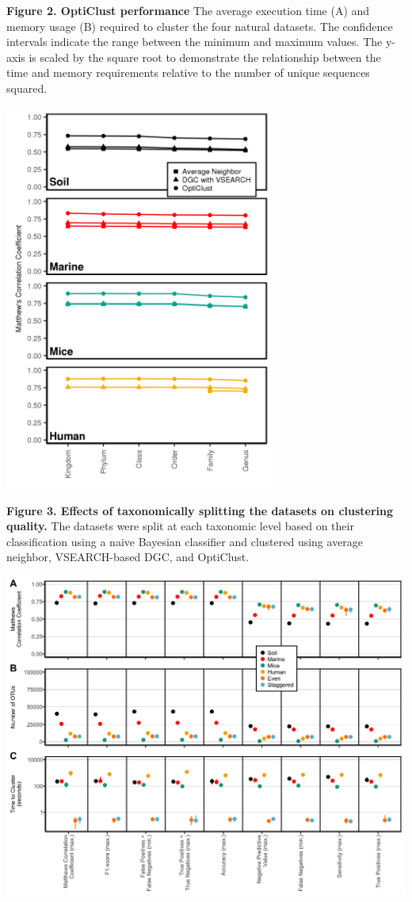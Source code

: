 \documentclass[11pt,]{article}
\begin{document}
\textbf{Figure 2. OptiClust performance} The average execution time (A)
and memory usage (B) required to cluster the four natural datasets. The
confidence intervals indicate the range between the minimum and maximum
values. The y-axis is scaled by the square root to demonstrate the
relationship between the time and memory requirements relative to the
number of unique sequences squared.

\newpage

\includegraphics[width=3.5in]{results/figures/split_mcc.png}

\textbf{Figure 3. Effects of taxonomically splitting the datasets on
clustering quality.} The datasets were split at each taxonomic level
based on their classification using a naive Bayesian classifier and
clustered using average neighbor, VSEARCH-based DGC, and OptiClust.

\newpage

\includegraphics[width=6.0in]{results/figures/performance_other.png}
\end{document}
